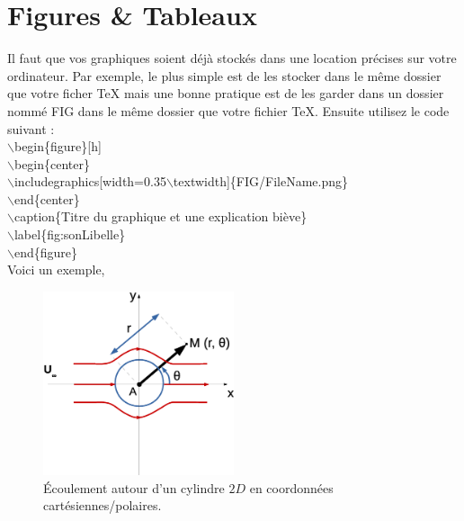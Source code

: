 \documentclass[a4paper,10pt]{report} %
\begin{document}
\section{Figures \& Tableaux}
\label{sec:FigTables}
Il faut que vos graphiques soient déjà stockés dans une location précises sur votre ordinateur. Par exemple, le plus simple est de les stocker dans le même dossier que votre ficher TeX mais une bonne pratique est de les garder dans un  dossier nommé FIG dans le même dossier que votre fichier TeX. Ensuite utilisez le code suivant :\\
$\backslash$begin\{figure\}[h]\\
$\backslash$begin\{center\}\\
$\backslash$includegraphics[width=0.35$\backslash$textwidth]\{FIG/FileName.png\}\\
$\backslash$end\{center\}\\
$\backslash$caption\{Titre du graphique et une explication biève\}\\
$\backslash$label\{fig:sonLibelle\}\\
$\backslash$end\{figure\}\\

Voici un exemple,
\begin{figure}[h]
\begin{center}
	\includegraphics[width=0.5\textwidth]{FIG/fiGGs_polar.eps}
\end{center}
\caption{Écoulement autour d'un cylindre $2D$ en coordonnées cartésiennes/polaires.}
\label{fig:figureCoorPol}
\end{figure}
\end{document}
